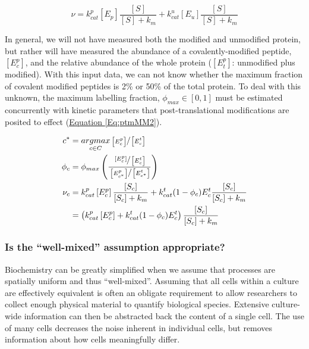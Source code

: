 \begin{equation}
\nu = k_{cat}^{p}\left[E_{p}\right]\frac{\left[S\right]}{\left[S\right] + k_{m}} + k_{cat}^{u}\left[E_{u}\right]\frac{\left[S\right]}{\left[S\right] + k_{m}}\label{Eq:ptmMM1}
\end{equation}

In general, we will not have measured both the modified and unmodified protein, but rather will have measured the abundance of a covalently-modified peptide, $\left[E^{p}_{c}\right]$, and the relative abundance of the whole protein ($\left[E^{p}_{t}\right]$: unmodified plus modified). With this input data, we can not know whether the maximum fraction of covalent modified peptides is 2\% or 50\% of the total protein. To deal with this unknown, the maximum labelling fraction, $\phi_{max} \in [0, 1]$ must be estimated concurrently with kinetic parameters that post-translational modifications are posited to effect (\hyperref[Eq:ptmMM2]{Equation \ref{Eq:ptmMM2}}).

\begin{align}
c^{*} &= \underset{c\in C}{argmax} \sfrac{\left[E^{p}_{c}\right]}{\left[E^{t}_{c}\right]}\notag\\
\phi_{c} &= \phi_{max}\left(\frac{\sfrac{\left[E^{p}_{c}\right]}{\left[E^{t}_{c}\right]}}{\sfrac{\left[E^{p}_{c^*}\right]}{\left[E^{t}_{c^*}\right]}}\right)\notag\\
\nu_c &= k_{cat}^{p}\left[E_c^{p}\right]\frac{\left[S_c\right]}{\left[S_c\right] + k_{m}} + k_{cat}^{t}(1-\phi_c)E_{c}^{t}\frac{\left[S_c\right]}{\left[S_c\right] + k_{m}}\notag\\
 &= \left(k_{cat}^{p}\left[E_c^{p}\right] + k_{cat}^{t}(1-\phi_c)E_{c}^{t}\right) \frac{\left[S_c\right]}{\left[S_c\right] + k_{m}}\label{Eq:ptmMM2}
\end{align}

\subsubsection{Is the ``well-mixed'' assumption appropriate?}

Biochemistry can be greatly simplified when we assume that processes are spatially uniform and thus ``well-mixed''. Assuming that all cells within a culture are effectively equivalent is often an obligate requirement to allow researchers to collect enough physical material to quantify biological species. Extensive culture-wide information can then be abstracted back the content of a single cell. The use of many cells decreases the noise inherent in individual cells, but removes information about how cells meaningfully differ. 

